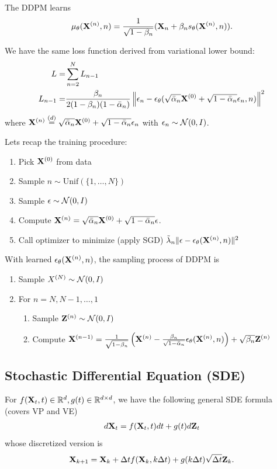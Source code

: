 \documentclass[11pt, a4paper]{article}
\begin{document}
The DDPM learns
\begin{align}
    \mu_\theta ({\bf X}^{(n)}, n) = \frac{1}{\sqrt{1-\beta_n}} ({\bf X}_n + \beta_n s_\theta({\bf X}^{(n)}, n)).
\end{align}

We have the same loss function derived from variational lower bound:
\begin{align}
    L =& \sum_{n=2}^N L_{n-1}\\
    L_{n-1} =& \frac{\beta_n}{2(1-\beta_n)(1-\bar{\alpha}_n)} \left\|\epsilon_n - \epsilon_{\theta}(\sqrt{\bar{\alpha}_n} {\bf X}^{(0)} + \sqrt{1-\bar{\alpha}_n}\epsilon_n, n)\right\|^2
\end{align}
where ${\bf X}^{(n)} \stackrel{(d)}{=} \sqrt{\bar{\alpha}_n}{\bf X}^{(0)} + \sqrt{1-\bar{\alpha}_n} \epsilon_n$ with $\epsilon_n\sim{\cal N}(0, I)$.

Lets recap the training procedure:
\begin{enumerate}
    \item Pick ${\bf X}^{(0)}$ from data
    \item Sample $n\sim\mbox{Unif}(\{1, \dots, N\})$
    \item Sample $\epsilon\sim {\cal N}(0, I)$
    \item Compute ${\bf X}^{(n)} = \sqrt{\bar{\alpha}_n} {\bf X}^{(0)} + \sqrt{1-\bar{\alpha}_n} \epsilon$.
    \item Call optimizer to minimize (apply SGD) $\tilde{\lambda}_n \|\epsilon - \epsilon_\theta({\bf X}^{(n)}, n)\|^2$
\end{enumerate}
With learned $\epsilon_\theta({\bf X}^{(n)}, n)$, the sampling process of DDPM is 
\begin{enumerate}
    \item Sample $X^{(N)} \sim {\cal N}(0, I)$
    \item For $n= N, N-1, \dots, 1$
    \begin{enumerate}
        \item Sample ${\bf Z}^{(n)} \sim {\cal N}(0, I)$
        \item Compute ${\bf X}^{(n-1)} = \frac{1}{\sqrt{1-\beta_n}} \left({\bf X}^{(n)} - \frac{\beta_n}{\sqrt{1-\bar{\alpha}_n}}\epsilon_\theta({\bf X}^{(n)}, n)\right) + \sqrt{\beta_n} {\bf Z}^{(n)}$
    \end{enumerate}
\end{enumerate}


\subsection{Stochastic Differential Equation (SDE)}
For $f({\bf X}_t, t)\in\mathbb{R}^d, g(t) \in \mathbb{R}^{d\times d}$, we have the following general SDE formula (covers VP and VE)
\begin{align}
    d{\bf X}_t = f({\bf X}_t, t)dt + g(t) d{\bf Z}_t
\end{align}
whose discretized version is
\begin{align}
    {\bf X}_{k+1} = {\bf X}_k + \Delta t f({\bf X}_k, k\Delta t) + g(k\Delta t)\sqrt{\Delta t}{\bf Z}_k.
\end{align}
\end{document}
